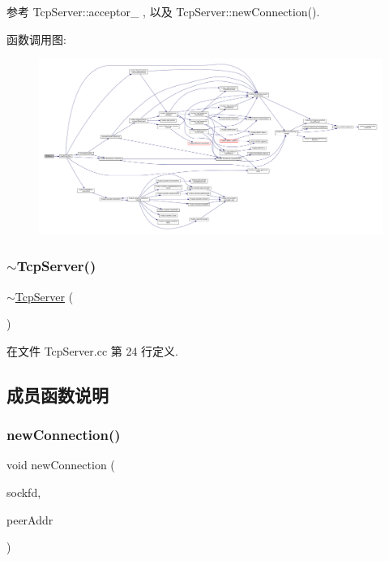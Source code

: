 参考 Tcp\+Server\+::acceptor\+\_\+ , 以及 Tcp\+Server\+::new\+Connection().

函数调用图\+:
\nopagebreak
\begin{figure}[H]
\begin{center}
\leavevmode
\includegraphics[width=350pt]{classmuduo_1_1TcpServer_aca9a1702da801c3275b2e70d233cc0c7_cgraph}
\end{center}
\end{figure}
\mbox{\label{classmuduo_1_1TcpServer_a4eb415b51f7d85a5d4ac91370d0cbb00}} 
\subsubsection{\texorpdfstring{$\sim$\+Tcp\+Server()}{~TcpServer()}}
{\footnotesize\ttfamily $\sim$\hyperlink{classmuduo_1_1TcpServer}{Tcp\+Server} (\begin{DoxyParamCaption}{ }\end{DoxyParamCaption})}



在文件 Tcp\+Server.\+cc 第 24 行定义.



\subsection{成员函数说明}
\mbox{\label{classmuduo_1_1TcpServer_a6e7510f45cfa67ddc79aa8689fd79562}} 
\subsubsection{\texorpdfstring{new\+Connection()}{newConnection()}}
{\footnotesize\ttfamily void new\+Connection (\begin{DoxyParamCaption}\item[{int}]{sockfd,  }\item[{const \hyperlink{classmuduo_1_1InetAddress}{Inet\+Address} \&}]{peer\+Addr }\end{DoxyParamCaption})\hspace{0.3cm}{\ttfamily [private]}}



